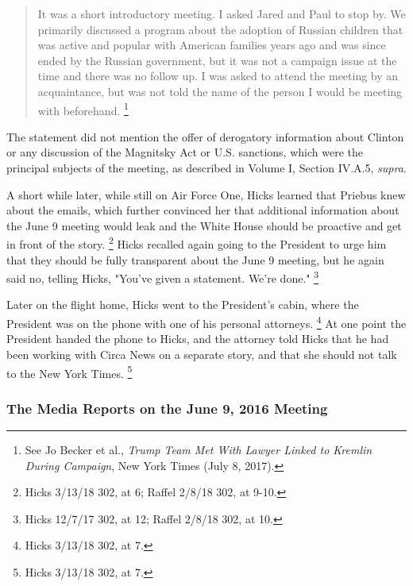\begin{quote}
It was a short introductory meeting.
I asked Jared and Paul to stop by.
We primarily discussed a program about the adoption of Russian children that was active and popular with American families years ago and was since ended by the Russian government, but it was not a campaign issue at the time and there was no follow up.
I was asked to attend the meeting by an acquaintance, but was not told the name of the person I would be meeting with beforehand.%
\footnote{See Jo Becker et al., \textit{Trump Team Met With Lawyer Linked to Kremlin During Campaign}, New York Times (July 8, 2017).}
\end{quote}

The statement did not mention the offer of derogatory information about Clinton or any discussion of the Magnitsky Act or U.S. sanctions, which were the principal subjects of the meeting, as described in Volume I, Section IV.A.5, \textit{supra}.

A short while later, while still on Air Force One, Hicks learned that Priebus knew about the emails, which further convinced her that additional information about the June 9 meeting would leak and the White House should be proactive and get in front of the story.%
\footnote{Hicks 3/13/18 302, at 6;
Raffel 2/8/18 302, at 9-10.}
Hicks recalled again going to the President to urge him that they should be fully transparent about the June 9 meeting, but he again said no, telling Hicks, "You've given a statement.
We're done."%
\footnote{Hicks 12/7/17 302, at 12;
Raffel 2/8/18 302, at 10.}

Later on the flight home, Hicks went to the President's cabin, where the President was on the phone with one of his personal attorneys.%
\footnote{Hicks 3/13/18 302, at 7.}
At one point the President handed the phone to Hicks, and the attorney told Hicks that he had been working with Circa News on a separate story, and that she should not talk to the New York Times.%
\footnote{Hicks 3/13/18 302, at 7.}

\subsubsection{The Media Reports on the June 9, 2016 Meeting}

